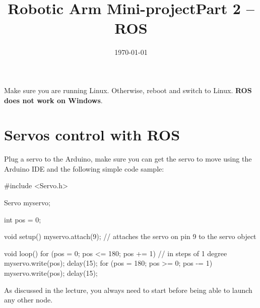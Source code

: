 \documentclass{instructions}
\title{Robotic Arm Mini-project\newline Part 2 -- ROS}
\date{\today}
\begin{document}
\maketitle




\pagebreak

\intro

    
Make sure you are running Linux. Otherwise, reboot and switch to Linux.
\textbf{ROS does not work on Windows}.


\part{Servos control with ROS}


Plug a servo to the Arduino, make sure you can get the servo to move using the
Arduino IDE and the following simple code sample:

\begin{cppcode}
#include <Servo.h>

Servo myservo;

int pos = 0;

void setup() {
  myservo.attach(9);  // attaches the servo on pin 9 to the servo object
}

void loop() {
  for (pos = 0; pos <= 180; pos += 1) {
    // in steps of 1 degree
    myservo.write(pos);
    delay(15);
  }
  for (pos = 180; pos >= 0; pos -= 1) {
    myservo.write(pos);
    delay(15);
  }
}
\end{cppcode}


As discussed in the lecture, you always need to start  before being able to launch any other node.
\end{document}

